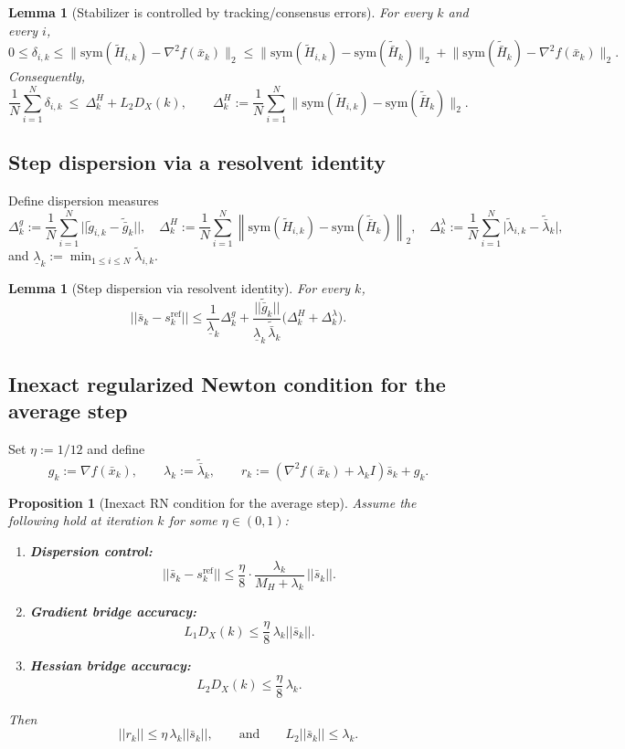 \documentclass[11pt,a4paper]{article}
\def\norm#1{||#1||}%
\newtheorem{lemma}[theorem]{Lemma}
\newtheorem{proposition}[theorem]{Proposition}
\newcommand{\norm}[1]{\left\|#1\right\|}
\newcommand{\normtwo}[1]{\left\|#1\right\|_2}
\begin{document}
\begin{lemma}[Stabilizer is controlled by tracking/consensus errors]\label{lem:delta_control}
	For every $k$ and every $i$,
	\[
	0\le \delta_{i,k}\le \Big\|\mathrm{sym}(\tilde H_{i,k})-\nabla^2 f(\bar x_k)\Big\|_2
	\le \Big\|\mathrm{sym}(\tilde H_{i,k})-\mathrm{sym}(\tilde{\bar H}_k)\Big\|_2
	+\Big\|\mathrm{sym}(\tilde{\bar H}_k)-\nabla^2 f(\bar x_k)\Big\|_2.
	\]
	Consequently,
	\[
	\frac1N\sum_{i=1}^N\delta_{i,k}
	\ \le\ \Delta_k^H + L_2 D_X(k),
	\qquad
	\Delta_k^H:=\frac1N\sum_{i=1}^N\big\|\mathrm{sym}(\tilde H_{i,k})-\mathrm{sym}(\tilde{\bar H}_k)\big\|_2.
	\]
\end{lemma}

\subsection{Step dispersion via a resolvent identity}
Define dispersion measures
\[
\Delta^g_k:=\frac1N\sum_{i=1}^N \norm{\tilde g_{i,k}-\tilde{\bar g}_k},\quad
\Delta^H_k:=\frac1N\sum_{i=1}^N \normtwo{\mathrm{sym}(\tilde H_{i,k})-\mathrm{sym}(\tilde{\bar H}_k)},\quad
\Delta^\lambda_k:=\frac1N\sum_{i=1}^N \big|\tilde\lambda_{i,k}-\tilde{\bar\lambda}_k\big|,
\]
and $\underline\lambda_k:=\min_{1\le i\le N}\tilde\lambda_{i,k}$.

\begin{lemma}[Step dispersion via resolvent identity]\label{lem:step-disp}
	For every $k$,
	\[
	\norm{\bar s_k-s^{\mathrm{ref}}_k}
	\le \frac{1}{\underline\lambda_k}\Delta^g_k
	+\frac{\norm{\tilde{\bar g}_k}}{\underline\lambda_k\,\tilde{\bar\lambda}_k}\big(\Delta^H_k+\Delta^\lambda_k\big).
	\]
\end{lemma}

\subsection{Inexact regularized Newton condition for the average step}
Set $\eta:=1/12$ and define
\[
g_k:=\nabla f(\bar x_k),
\qquad
\lambda_k:=\tilde{\bar\lambda}_k,
\qquad
r_k := (\nabla^2 f(\bar x_k)+\lambda_k I)\bar s_k+g_k.
\]

\begin{proposition}[Inexact RN condition for the average step]\label{prop:inexact-rn}
	Assume the following hold at iteration $k$ for some $\eta\in(0,1)$:
	\begin{enumerate}[leftmargin=1.2em,itemsep=2pt]
		\item \textbf{Dispersion control:}
		\[
		\norm{\bar s_k-s^{\mathrm{ref}}_k}\le \frac{\eta}{8}\cdot \frac{\lambda_k}{M_H+\lambda_k}\,\norm{\bar s_k}.
		\]
		\item \textbf{Gradient bridge accuracy:}
		\[
		L_1 D_X(k)\le \frac{\eta}{8}\,\lambda_k\norm{\bar s_k}.
		\]
		\item \textbf{Hessian bridge accuracy:}
		\[
		L_2 D_X(k)\le \frac{\eta}{8}\,\lambda_k.
		\]
	\end{enumerate}
	Then
	\[
	\norm{r_k}\le \eta\,\lambda_k\norm{\bar s_k},
	\qquad\text{and}\qquad
	L_2\norm{\bar s_k}\le \lambda_k.
	\]
\end{proposition}
\end{document}
